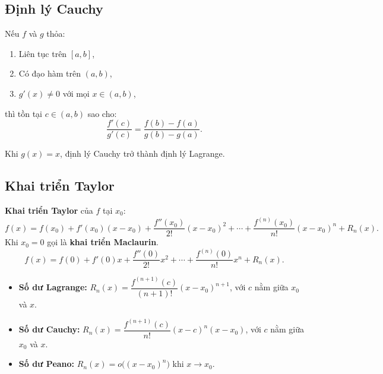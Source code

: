 \documentclass[12pt,a4paper]{article}
\begin{document}
\subsection{Định lý Cauchy}

\begin{dinhly}[title={Định lý Cauchy (Giá trị trung bình tổng quát)}]
  Nếu $f$ và $g$ thỏa:
  \begin{enumerate}
    \item Liên tục trên $[a,b]$,
    \item Có đạo hàm trên $(a,b)$,
    \item $g'(x) \ne 0$ với mọi $x \in (a,b)$,
  \end{enumerate}
  thì tồn tại $c \in (a,b)$ sao cho:
  \[
    \frac{f'(c)}{g'(c)} = \frac{f(b) - f(a)}{g(b) - g(a)}.
  \]
\end{dinhly}

\begin{luuy}
  Khi $g(x) = x$, định lý Cauchy trở thành định lý Lagrange.
\end{luuy}

\subsection{Khai triển Taylor}

\begin{congthuc}
  \textbf{Khai triển Taylor} của $f$ tại $x_0$:
  \[
    f(x) = f(x_0) + f'(x_0)(x - x_0) + \frac{f''(x_0)}{2!}(x - x_0)^2 + \cdots + \frac{f^{(n)}(x_0)}{n!}(x - x_0)^n + R_n(x).
  \]
  Khi $x_0 = 0$ gọi là \textbf{khai triển Maclaurin}.
  \[
    f(x) = f(0) + f'(0)x + \frac{f''(0)}{2!}x^2 + \cdots + \frac{f^{(n)}(0)}{n!}x^n + R_n(x).
  \]
\end{congthuc}

\begin{congthuc}[title={Các dạng số dư Taylor}]
  \begin{itemize}
    \item \textbf{Số dư Lagrange:} $R_n(x) = \dfrac{f^{(n+1)}(c)}{(n+1)!}(x - x_0)^{n+1}$, với $c$ nằm giữa $x_0$ và $x$.
    \item \textbf{Số dư Cauchy:} $R_n(x) = \dfrac{f^{(n+1)}(c)}{n!}(x - c)^n(x - x_0)$, với $c$ nằm giữa $x_0$ và $x$.
    \item \textbf{Số dư Peano:} $R_n(x) = o\bigl((x - x_0)^n\bigr)$ khi $x \to x_0$.
  \end{itemize}
\end{congthuc}
\end{document}

